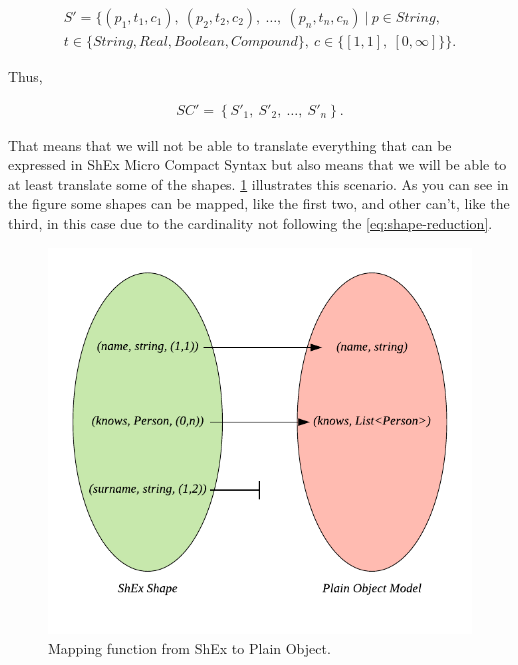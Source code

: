 \begin{equation}\label{eq:shape-reduction}
\begin{gathered}
S' = \{ (p_{1},t_{1},c_{1}),\ (p_{2},t_{2},c_{2}),\ \dots,\ (p_{n},t_{n},c_{n})\ |\ p \in String,\\
t \in \{String, Real, Boolean, Compound\},\ c \in \{[1,1],\ [0,\infty] \} \}.
\end{gathered}
\end{equation}

Thus,

\begin{equation}\label{eq:schema-reduction}
\begin{gathered}
SC' = \left \{ S'_1,\ S'_2,\ \dots,\ S'_n \right \}.
\end{gathered}
\end{equation}

That means that we will not be able to translate everything that can be expressed in ShEx Micro Compact Syntax but also means that we will be able
to at least translate some of the shapes. \cref{fig:mapping-f} illustrates this scenario. As you can see in the figure some shapes can be mapped, like the first two,
and other can't, like the third, in this case due to the cardinality not following the \cref{eq:shape-reduction}.

\begin{figure}
    \includegraphics[scale=0.5]{images/shex-lite-mapping.pdf}
    \centering
    \caption[Mapping function from ShEx to Plain Object]{Mapping function from ShEx to Plain Object.}
    \label{fig:mapping-f}
\end{figure}